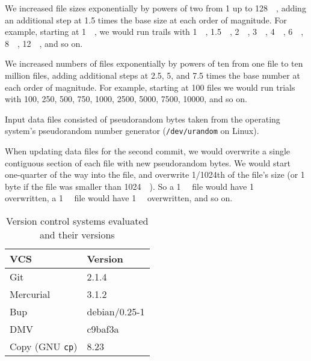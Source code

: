 We increased file sizes exponentially by powers of two from \SI{1}{\byte} up to
\SI{128}{\gibi\byte}, adding an additional step at \num{1.5} times the base size
at each order of magnitude. For example, starting at \SI{1}{\mebi\byte}, we
would run trails with \SI{1}{\mebi\byte}, \SI{1.5}{\mebi\byte},
\SI{2}{\mebi\byte}, \SI{3}{\mebi\byte}, \SI{4}{\mebi\byte}, \SI{6}{\mebi\byte},
\SI{8}{\mebi\byte}, \SI{12}{\mebi\byte}, and so on.

We increased numbers of files exponentially by powers of ten from one file to
ten million files, adding additional steps at \num{2.5}, \num{5}, and \num{7.5}
times the base number at each order of magnitude. For example, starting at
\num{100} files we would run trials with \num{100}, \num{250}, \num{500},
\num{750}, \num{1000}, \num{2500}, \num{5000}, \num{7500}, \num{10000}, and so
on.

Input data files consisted of pseudorandom bytes taken from the operating
system's pseudorandom number generator (\lstinline{/dev/urandom} on Linux).

When updating data files for the second \gls{commit}, we would overwrite a
single contiguous section of each file with new pseudorandom bytes. We would
start one-quarter of the way into the file, and overwrite \num{1/1024}th of the
file's size (or 1 byte if the file was smaller than \SI{1024}{\kibi\byte}). So a
\SI{1}{\mebi\byte} file would have \SI{1}{\kibi\byte} overwritten, a
\SI{1}{\gibi\byte} file would have \SI{1}{\mebi\byte} overwritten, and so on.

%


\begin{table}[p]
    \caption{Version control systems evaluated and their versions}
    \label{vcs-versions}
    \centering
    \begin{tabular}{ l l }
        VCS & Version \\
        \midrule
        Git & 2.1.4 \\
        Mercurial & 3.1.2 \\
        Bup & debian/0.25-1 \\
        DMV & c9baf3a \\
        Copy (GNU \lstinline{cp}) & 8.23 \\
    \end{tabular}
\end{table}

